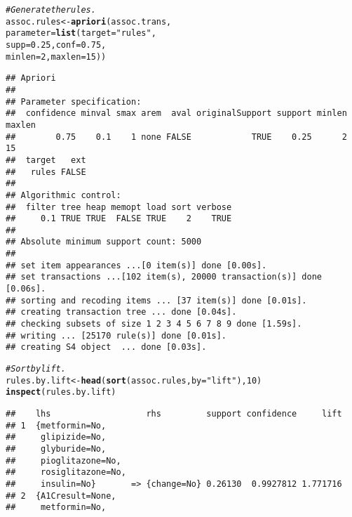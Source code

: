 \documentclass{article}\usepackage[]{graphicx}\usepackage[]{color}
\makeatletter
\newcommand{\hlnum}[1]{\textcolor[rgb]{0.686,0.059,0.569}{#1}}%
\newcommand{\hlstr}[1]{\textcolor[rgb]{0.192,0.494,0.8}{#1}}%
\newcommand{\hlcom}[1]{\textcolor[rgb]{0.678,0.584,0.686}{\textit{#1}}}%
\newcommand{\hlstd}[1]{\textcolor[rgb]{0.345,0.345,0.345}{#1}}%
\newcommand{\hlkwb}[1]{\textcolor[rgb]{0.69,0.353,0.396}{#1}}%
\newcommand{\hlkwc}[1]{\textcolor[rgb]{0.333,0.667,0.333}{#1}}%
\newcommand{\hlkwd}[1]{\textcolor[rgb]{0.737,0.353,0.396}{\textbf{#1}}}%
\newenvironment{kframe}{%
 \def\at@end@of@kframe{}%
 \ifinner\ifhmode%
  \def\at@end@of@kframe{\end{minipage}}%
  \begin{minipage}{\columnwidth}%
 \fi\fi%
 \def\FrameCommand##1{\hskip\@totalleftmargin \hskip-\fboxsep
 \colorbox{shadecolor}{##1}\hskip-\fboxsep
     \hskip-\linewidth \hskip-\@totalleftmargin \hskip\columnwidth}%
 \MakeFramed {\advance\hsize-\width
   \@totalleftmargin\z@ \linewidth\hsize
   \@setminipage}}%
 {\par\unskip\endMakeFramed%
 \at@end@of@kframe}
\newenvironment{knitrout}{}{} %
\makeatother
\begin{document}
\begin{knitrout}
\color{fgcolor}\begin{kframe}
\begin{alltt}
\hlcom{# Generate the rules.}
\hlstd{assoc.rules} \hlkwb{<-} \hlkwd{apriori}\hlstd{(assoc.trans,}
                       \hlkwc{parameter}\hlstd{=}\hlkwd{list}\hlstd{(}\hlkwc{target}\hlstd{=}\hlstr{"rules"}\hlstd{,}
                                      \hlkwc{supp}\hlstd{=}\hlnum{0.25}\hlstd{,} \hlkwc{conf}\hlstd{=}\hlnum{0.75}\hlstd{,}
                                      \hlkwc{minlen}\hlstd{=}\hlnum{2}\hlstd{,} \hlkwc{maxlen}\hlstd{=}\hlnum{15}\hlstd{))}
\end{alltt}
\begin{verbatim}
## Apriori
## 
## Parameter specification:
##  confidence minval smax arem  aval originalSupport support minlen maxlen
##        0.75    0.1    1 none FALSE            TRUE    0.25      2     15
##  target   ext
##   rules FALSE
## 
## Algorithmic control:
##  filter tree heap memopt load sort verbose
##     0.1 TRUE TRUE  FALSE TRUE    2    TRUE
## 
## Absolute minimum support count: 5000 
## 
## set item appearances ...[0 item(s)] done [0.00s].
## set transactions ...[102 item(s), 20000 transaction(s)] done [0.06s].
## sorting and recoding items ... [37 item(s)] done [0.01s].
## creating transaction tree ... done [0.04s].
## checking subsets of size 1 2 3 4 5 6 7 8 9 done [1.59s].
## writing ... [25170 rule(s)] done [0.01s].
## creating S4 object  ... done [0.03s].
\end{verbatim}
\begin{alltt}
\hlcom{# Sort by lift.}
\hlstd{rules.by.lift} \hlkwb{<-} \hlkwd{head}\hlstd{(}\hlkwd{sort}\hlstd{(assoc.rules,} \hlkwc{by}\hlstd{=}\hlstr{"lift"}\hlstd{),} \hlnum{10}\hlstd{)}
\hlkwd{inspect}\hlstd{(rules.by.lift)}
\end{alltt}
\begin{verbatim}
##    lhs                   rhs         support confidence     lift
## 1  {metformin=No,                                               
##     glipizide=No,                                               
##     glyburide=No,                                               
##     pioglitazone=No,                                            
##     rosiglitazone=No,                                           
##     insulin=No}       => {change=No} 0.26130  0.9927812 1.771716
## 2  {A1Cresult=None,                                             
##     metformin=No,                                               

\end{verbatim}
\end{kframe}
\end{knitrout}
\end{document}
